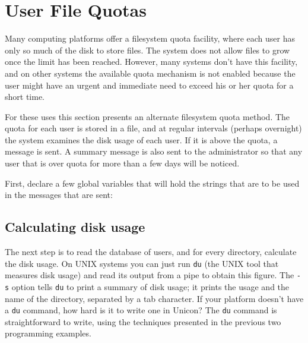 \section{User File Quotas}

Many computing platforms offer a filesystem quota facility,
where each user has only so much of the disk to store files. The
system does not allow files to grow once the
limit has been reached. However, many systems don't
have this facility, and on other systems the available quota mechanism
is not enabled because the user might have an urgent and immediate need
to exceed his or her quota for a short time.

For these uses this section presents an alternate filesystem quota
method. The quota for each user is stored in a file, and at regular
intervals (perhaps overnight) the system examines the disk usage of
each user. If it is above the quota, a message is sent. A summary
message is also sent to the administrator so that any user that is over
quota for more than a few days will be noticed.

First, declare a few global variables that will hold the strings that
are to be used in the messages that are sent: 


\subsection{Calculating disk usage}

The next step is to read the database of users, and for every
directory, calculate the disk usage. On
UNIX systems you can just run \texttt{du} (the UNIX tool that
measures disk usage) and read its output from a pipe to obtain this
figure. The \texttt{{}-s} option tells \texttt{du} to print a summary
of disk usage; it prints the usage and the name of the directory,
separated by a tab character. If your platform doesn't
have a \texttt{du} command, how hard is it to write one in Unicon? The
\texttt{du} command is straightforward to write, using
the techniques presented in the previous two programming examples.

